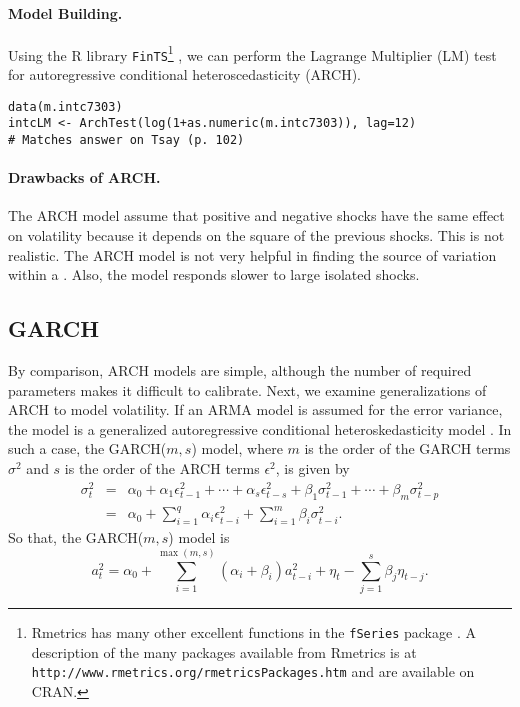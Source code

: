 \paragraph{Model Building.}
Using the R library \texttt{FinTS}\footnote{Rmetrics has many other excellent functions in the \texttt{fSeries} package \cite{fseries-R}. A description of the many packages available from Rmetrics is at \texttt{http://www.rmetrics.org/rmetricsPackages.htm} and are available on CRAN.}
\cite{fints-R}, we can perform the Lagrange Multiplier (LM) test for autoregressive conditional heteroscedasticity (ARCH).
\begin{verbatim}
data(m.intc7303)
intcLM <- ArchTest(log(1+as.numeric(m.intc7303)), lag=12)
# Matches answer on Tsay (p. 102)
\end{verbatim}

\paragraph{Drawbacks of ARCH.} The ARCH model assume that positive and negative shocks have the same effect on volatility because it depends on the square of the previous shocks. This is not realistic. The ARCH model is not very helpful in finding the source of variation within a \fts{}. Also, the model responds slower to large isolated shocks.

\subsection{GARCH}\label{garch}
By comparison, ARCH models are simple, although the number of required parameters makes it difficult to calibrate. Next, we examine generalizations of ARCH to model volatility.
If an ARMA model is assumed for the error variance, the model is a generalized autoregressive conditional heteroskedasticity model \cite{bollerslev1986garch}. In such a case, the GARCH($m, s$) model, where $m$ is the order of the GARCH terms $\sigma^2$ and $s$ is the order of the ARCH terms $\epsilon^2$, is given by
\begin{eqnarray*}
\sigma_t^2&=&\alpha_0 + \alpha_1 \epsilon_{t-1}^2 + \cdots + \alpha_s \epsilon_{t-s}^2 + \beta_1 \sigma_{t-1}^2 + \cdots + \beta_m\sigma_{t-p}^2 \\
&=& \alpha_0 + \sum_{i=1}^q \alpha_i \epsilon_{t-i}^2 + \sum_{i=1}^m \beta_i \sigma_{t-i}^2.
\end{eqnarray*}
So that, the GARCH($m,s$) model is
\begin{equation}
a^2_t = \alpha_0 + \sum^{\max(m,s)}_{i=1} (\alpha_i + \beta_i) a^2_{t-i}+\eta_t
- \sum^s_{j=1} \beta_j \eta_{t-j}.
\label{eq:garch}
\end{equation}

